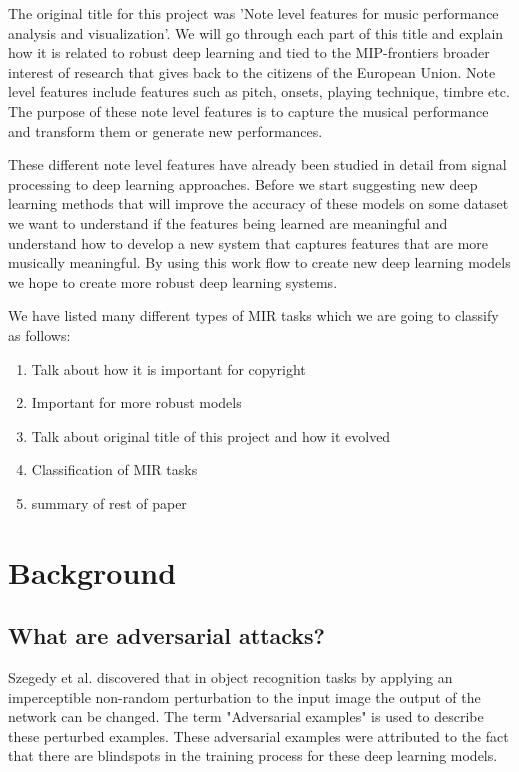 \documentclass[journal,onecolumn]{IEEEtran}
\begin{document}
The original title for this project was 'Note level features for music performance analysis and visualization'. We will go through each part of this title and explain how it is related to robust deep learning and tied to the MIP-frontiers broader interest of research that gives back to the citizens of the European Union. Note level features include features such as pitch, onsets, playing technique, timbre etc. The purpose of these note level features is to capture the musical performance and transform them or generate new performances.

These different note level features have already been studied in detail from signal processing to deep learning approaches. Before we start suggesting new deep learning methods that will improve the accuracy of these models on some dataset we want to understand if the features being learned are meaningful and understand how to develop a new system that captures features that are more musically meaningful. By using this work flow to create new deep learning models we hope to create more robust deep learning systems.

We have listed many different types of MIR tasks which we are going to classify as follows:



\begin{enumerate}
\item Talk about how it is important for copyright
\item Important for more robust models
\item Talk about original title of this project and how it evolved
\item Classification of MIR tasks
\item summary of rest of paper
\end{enumerate}

 

	

\section{Background}


\subsection{What are adversarial attacks?}
Szegedy et al. \cite{szegedy_intriguing_2013} discovered that in object recognition tasks by applying an imperceptible non-random perturbation to the input image the output of the network can be changed. The term "Adversarial examples" is used to describe these perturbed examples. These adversarial examples were attributed to the fact that there are blindspots in the training process for these deep learning models. %
\end{document}

